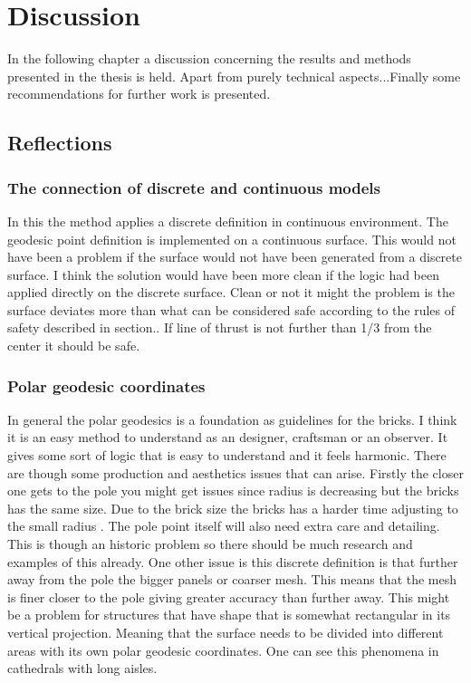 \chapter{Discussion}

In the following chapter a discussion concerning the results and methods presented in the thesis is held. Apart from purely technical aspects...Finally some recommendations for further work is presented.

\section{Reflections}

\subsection{The connection of discrete and continuous models}
In this the method applies a discrete definition in continuous environment. The geodesic point definition is implemented on a continuous surface. This would not have been a problem if the surface would not have been generated from a discrete surface. I think the solution would have been more clean if the logic had been applied directly on the discrete surface. Clean or not it might the problem is the surface deviates more than what can be considered safe according to the rules of safety described in section.. If line of thrust is not further than 1/3 from the center it should be safe.

\subsection{ Polar geodesic coordinates}
In general the polar geodesics is a foundation as guidelines for the bricks. I think it is an easy method to understand as an designer, craftsman or an observer. It gives some sort of logic that is easy to understand and it feels harmonic. There are though some production and aesthetics issues that can arise. Firstly the closer one gets to the pole you might get issues since radius is decreasing but the bricks has the same size. Due to the brick size the bricks has a harder time adjusting to the small radius . The pole point itself will also need extra care and detailing. This is though an historic problem so there should be much research and examples of this already. One other issue is this discrete definition is that further away from the pole the bigger panels or coarser mesh. This means that the mesh is finer closer to the pole giving greater accuracy than further away. This might be a problem for structures that have shape that is somewhat rectangular in its vertical projection. Meaning that the surface needs to be divided into different areas with its own polar geodesic coordinates. One can see this phenomena in cathedrals with long aisles. 



